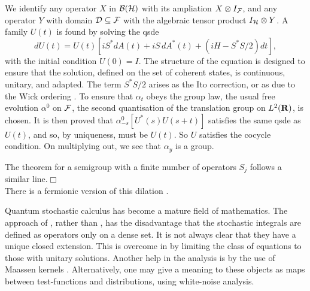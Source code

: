 We identify any operator $X$ in ${\cal B}({\cal H})$ with its ampliation
$X\otimes I_{\cal F}$, and any operator $Y$ with domain ${\cal D}
\subseteq{\cal F}$ with the algebraic tensor product $I_{\cal H}\otimes Y$.
A family $U(t)$ is found by solving the qsde
\begin{equation}
dU(t)=U(t)\left[iS^*dA(t)+iS\,dA^*(t)+(iH-S^*S/2)dt\right],
\end{equation}
with the initial condition $U(0)=I$. The structure of the equation is
designed to ensure that the solution, defined on the set of coherent states,
is continuous, unitary, and adapted. The term $S^*S/2$ arises as the Ito
correction, or as due to the Wick ordering \cite{Hudson2}.
To ensure that $\alpha_t$ obeys the group law, the usual free evolution
$\alpha^0$ on ${\cal F}$, the second quantisation of the
translation group on $L^2({\bf R})$, is chosen. It is then proved that
$\alpha^0_{-s}[U^*(s)U(s+t)]$ satisfies the same qsde as $U(t)$, and so,
by uniqueness, must be $U(t)$. So $U$ satisfies the cocycle condition.
On multiplying out, we see that $\alpha_y$ is a group.

The theorem for a semigroup with a finite number of operators $S_j$
follows a similar line.\hspace{\fill}$\Box$\\
There is a fermionic version of this dilation \cite{Applebaum}.

Quantum stochastic calculus has become a mature field of mathematics.
The approach of \cite{Hudson3}, rather than \cite{Barnett2}, has the
disadvantage that the stochastic integrals are defined as operators
only on a dense set. It is not always clear that they have a unique closed
extension.
This is overcome in \cite{Hudson3,Partha2} by limiting the class of
equations to those with unitary solutions.  Another help in the analysis
is by the use of Maassen kernels \cite{Maassen}. Alternatively, \cite{Obata}
one may give a meaning to these objects as maps between test-functions and
distributions, using white-noise analysis.

